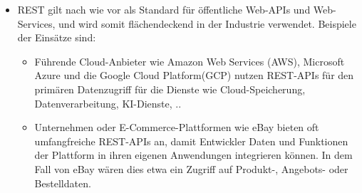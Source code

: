 \begin{itemize}
	\item REST gilt nach wie vor als Standard für öffentliche Web-APIs und Web-Services, und wird somit flächendeckend in der Industrie verwendet. Beispiele der Einsätze sind:
		\begin{itemize}
			\item Führende Cloud-Anbieter wie Amazon Web Services (AWS), Microsoft Azure und die Google Cloud Platform(GCP)  nutzen REST-APIs  für den primären Datenzugriff für  die Dienste wie Cloud-Speicherung, Datenverarbeitung, KI-Dienste, ..
			\item Unternehmen oder E-Commerce-Plattformen wie eBay bieten oft umfangfreiche REST-APIs an, damit Entwickler Daten und Funktionen der Plattform in ihren eigenen Anwendungen integrieren können. In dem Fall von eBay wären dies etwa ein Zugriff auf Produkt-, Angebots- oder Bestelldaten.
		\end{itemize}
		
\parencite{postman-rest-api-examples}
		

\end{itemize}
